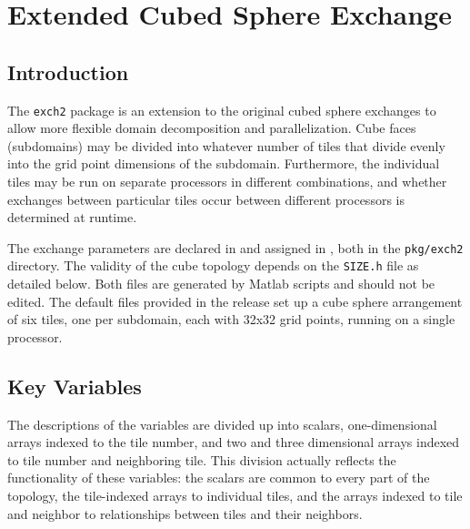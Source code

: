 


\section{Extended Cubed Sphere Exchange}
\label{sec:exch2}


\subsection{Introduction}

The \texttt{exch2} package is an extension to the original cubed
sphere exchanges to allow more flexible domain decomposition and
parallelization.  Cube faces (subdomains) may be divided into whatever
number of tiles that divide evenly into the grid point dimensions of
the subdomain.  Furthermore, the individual tiles may be run on
separate processors in different combinations, and whether exchanges
between particular tiles occur between different processors is
determined at runtime.

The exchange parameters are declared in
and assigned in
, both in
the \texttt{pkg/exch2} directory.  The validity of the cube topology
depends on the \texttt{SIZE.h} file as detailed below.  Both files are
generated by Matlab scripts and should not be edited.  The default
files provided in the release set up a cube sphere arrangement of six
tiles, one per subdomain, each with 32x32 grid points, running on a
single processor.

\subsection{Key Variables}

The descriptions of the variables are divided up into scalars,
one-dimensional arrays indexed to the tile number, and two and three
dimensional arrays indexed to tile number and neighboring tile.  This
division actually reflects the functionality of these variables: the
scalars are common to every part of the topology, the tile-indexed
arrays to individual tiles, and the arrays indexed to tile and
neighbor to relationships between tiles and their neighbors.

